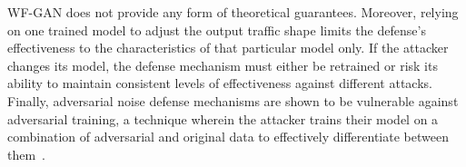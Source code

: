 WF-GAN does not provide any form of theoretical guarantees. 
Moreover, relying on one trained model to adjust the output traffic shape limits the defense's effectiveness to the characteristics of that particular model only.
If the attacker changes its model, the defense mechanism must either be retrained or risk its ability to maintain consistent levels of effectiveness against different attacks.
Finally, adversarial noise defense mechanisms are shown to be vulnerable against adversarial training, a technique wherein the attacker trains their model on a combination of adversarial and original data to effectively differentiate between them~\cite{zhang2019statistical}.
